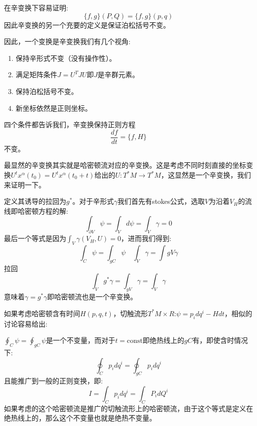 \documentclass[supercite]{HustGraduPaper}
\begin{document}
   在辛变换下容易证明:
   \begin{equation}
   \{f,g\}(P,Q) = \{f,g\}(p,q)
   \end{equation}
   因此辛变换的另一个充要的定义是保证泊松括号不变。
   
   因此，一个变换是辛变换我们有几个视角:
  \begin{enumerate}
  	\item 保持辛形式不变（没有操作性）。
  	\item 满足矩阵条件$J = U^T J U$即$J$是辛群元素。
  	\item 保持泊松括号不变。
  	\item 新坐标依然是正则坐标。
  \end{enumerate}
   四个条件都告诉我们，辛变换保持正则方程
   \begin{equation}
   \frac{df}{dt} =\{f,H\}
   \end{equation}
   不变。
   
   最显然的辛变换其实就是哈密顿流对应的辛变换。这是考虑不同时刻直接的坐标变换$U^t x^\alpha(t_0) = U^t x^\alpha(t_0 + t)$给出的$U: T^*M \to T^*M$，这显然是一个辛变换，我们来证明一下。
   
   定义其诱导的拉回为$g^*$。对于辛形式$\gamma$我们首先有stokes公式，选取$V$为沿着$V_H$的流线即哈密顿方程的解:
   \begin{equation}
   \int_{\partial V} \psi = \int_V d\psi = \int_V \gamma =0
   \end{equation}
   最后一个等式是因为$\int_V \gamma(V_H,U)  = 0$，进而我们得到:
   \begin{equation}
   \int_C \psi = \int_{gC} \psi \quad \int_V \gamma = \int {gV} \gamma
   \end{equation}
  拉回
   \begin{equation}
   \int_V g^* \gamma = \int_{gV} \gamma=\int_{V} \gamma
   \end{equation}
   意味着$\gamma = g^* \gamma$即哈密顿流也是一个辛变换。
   
   如果考虑哈密顿含有时间$H(p,q,t)$，切触流形$T^*M \times R$:$\psi = p_idq^i - Hdt$，相似的讨论容易给出:
   
   $\oint_C \psi = \oint_{gC} \psi$是一个不变量，而对于$t = \text{const}$即绝热线上的$gC$有，即使含时情况下:
   \begin{equation}
   \oint_C p_i dq^i = \oint_{gC} p_i dq^i 
   \end{equation}
   且能推广到一般的正则变换，即:
   \begin{equation}
   I = \int_C p_i dq^i = \int_{C} P_i dQ^i 
   \end{equation}
   如果考虑的这个哈密顿流是推广的切触流形上的哈密顿流，由于这个等式是定义在绝热线上的，那么这个不变量也就是绝热不变量。
\end{document}
